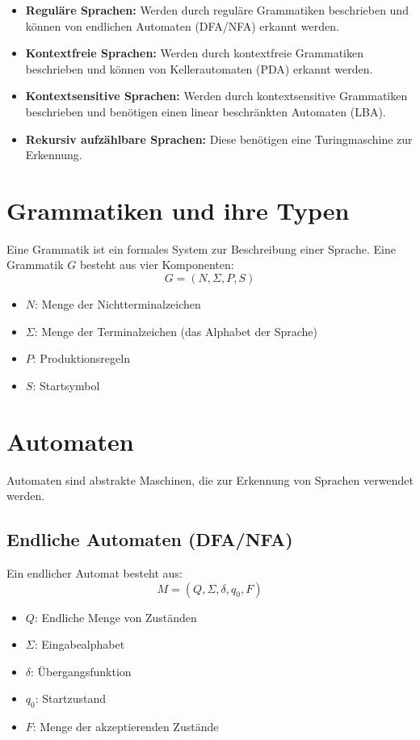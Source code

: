 \documentclass{article}
\begin{document}
	\begin{itemize}
		\item \textbf{Reguläre Sprachen:} Werden durch reguläre Grammatiken beschrieben und können von endlichen Automaten (DFA/NFA) erkannt werden.
		\item \textbf{Kontextfreie Sprachen:} Werden durch kontextfreie Grammatiken beschrieben und können von Kellerautomaten (PDA) erkannt werden.
		\item \textbf{Kontextsensitive Sprachen:} Werden durch kontextsensitive Grammatiken beschrieben und benötigen einen linear beschränkten Automaten (LBA).
		\item \textbf{Rekursiv aufzählbare Sprachen:} Diese benötigen eine Turingmaschine zur Erkennung.
	\end{itemize}
	
	\section{Grammatiken und ihre Typen}
	Eine Grammatik ist ein formales System zur Beschreibung einer Sprache. Eine Grammatik $G$ besteht aus vier Komponenten:
	\[ G = (N, \Sigma, P, S) \]
	\begin{itemize}
		\item $N$: Menge der Nichtterminalzeichen
		\item $\Sigma$: Menge der Terminalzeichen (das Alphabet der Sprache)
		\item $P$: Produktionsregeln
		\item $S$: Startsymbol
	\end{itemize}
	
	\section{Automaten}
	Automaten sind abstrakte Maschinen, die zur Erkennung von Sprachen verwendet werden.
	
	\subsection{Endliche Automaten (DFA/NFA)}
	Ein endlicher Automat besteht aus:
	\[ M = (Q, \Sigma, \delta, q_0, F) \]
	\begin{itemize}
		\item $Q$: Endliche Menge von Zuständen
		\item $\Sigma$: Eingabealphabet
		\item $\delta$: Übergangsfunktion
		\item $q_0$: Startzustand
		\item $F$: Menge der akzeptierenden Zustände
	\end{itemize}
	
\end{document}
